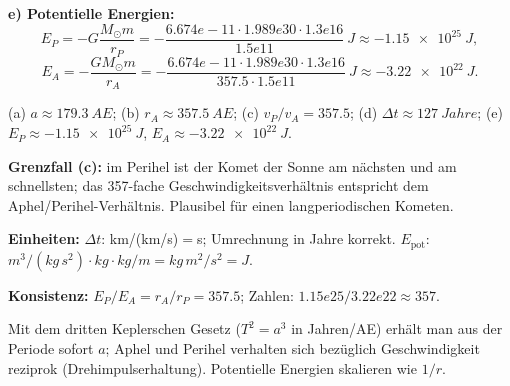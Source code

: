 \textbf{e) Potentielle Energien:}
\begin{equation}
  E_P = -G\frac{M_\odot m}{r_P}
  = -\frac{6.674e-11\cdot 1.989e30\cdot 1.3e16}{1.5e11}\ \si{J}
  \approx \qty{-1.15e25}{J},
\end{equation}
\begin{equation}
  E_A = -\frac{G M_\odot m}{r_A}
  = -\frac{6.674e-11\cdot 1.989e30\cdot 1.3e16}{357.5\cdot 1.5e11}\ \si{J}
  \approx \qty{-3.22e22}{J}.
\end{equation}

\begin{ergebnis}
(a) $a\approx\qty{179.3}{AE}$; (b) $r_A\approx\qty{357.5}{AE}$;
(c) $v_P/v_A=357.5$; (d) $\Delta t\approx\qty{127}{Jahre}$;
(e) $E_P\approx\qty{-1.15e25}{J}$, $E_A\approx\qty{-3.22e22}{J}$.
\end{ergebnis}

\begin{kontrolle}
\textbf{Grenzfall (c):} im Perihel ist der Komet der Sonne am nächsten und am
schnellsten; das 357-fache Geschwindigkeitsverhältnis entspricht dem
Aphel/Perihel-Verhältnis. Plausibel für einen langperiodischen Kometen.

\textbf{Einheiten:} $\Delta t$: km/(km/s)$=$s; Umrechnung in Jahre korrekt.
$E_\mathrm{pot}$: $m^3/(kg\,s^2)\cdot kg\cdot kg/m = kg\,m^2/s^2 = J$. \checkmark

\textbf{Konsistenz:} $E_P/E_A = r_A/r_P = 357.5$; Zahlen: $1.15e25/3.22e22
\approx 357$. \checkmark
\end{kontrolle}

\begin{merksatz}
Mit dem dritten Keplerschen Gesetz ($T^2=a^3$ in Jahren/AE) erhält man aus
der Periode sofort $a$; Aphel und Perihel verhalten sich bezüglich
Geschwindigkeit reziprok (Drehimpulserhaltung). Potentielle Energien
skalieren wie $1/r$.
\end{merksatz}

